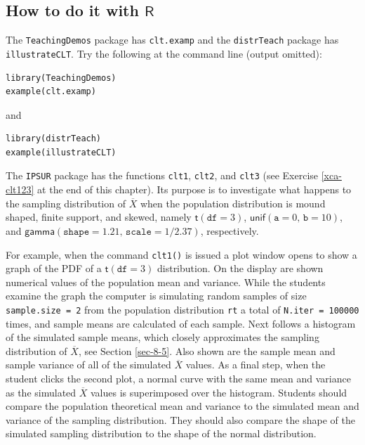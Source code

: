 \documentclass[captions=tableheading]{scrbook}
\begin{document}
\subsection{How to do it with \(\mathsf{R}\)}
\label{sec-8-3-1}


The \texttt{TeachingDemos} package \cite{Snowteachingdemos} has \texttt{clt.examp} and the \texttt{distrTeach} \cite{Ruckdescheldistr} package has \texttt{illustrateCLT}. Try the following at the command line (output omitted):

\lstset{language=R}
\begin{lstlisting}
library(TeachingDemos)
example(clt.examp)
\end{lstlisting}
and

\lstset{language=R}
\begin{lstlisting}
library(distrTeach)
example(illustrateCLT)
\end{lstlisting}

The \texttt{IPSUR}  package has the functions \texttt{clt1}, \texttt{clt2}, and \texttt{clt3} (see Exercise \ref{xca-clt123} at the end of this chapter). Its purpose is to investigate what happens to the sampling distribution of \(\overline{X}\) when the population distribution is mound shaped, finite support, and skewed, namely \(\mathsf{t}(\mathtt{df}=3)\), \(\mathsf{unif}(\mathtt{a}=0,\,\mathtt{b}=10)\), and \(\mathsf{gamma}(\mathtt{shape}=1.21,\,\mathtt{scale}=1/2.37)\), respectively. 

For example, when the command \texttt{clt1()}  is issued a plot window opens to show a graph of the PDF of a \(\mathsf{t}(\mathtt{df}=3)\) distribution. On the display are shown numerical values of the population mean and variance. While the students examine the graph the computer is simulating random samples of size \texttt{sample.size = 2} from the population distribution \texttt{rt} a total of \texttt{N.iter = 100000} times, and sample means are calculated of each sample. Next follows a histogram of the simulated sample means, which closely approximates the sampling distribution of \(\overline{X}\), see Section \ref{sec-8-5}. Also shown are the sample mean and sample variance of all of the simulated  \( \overline{X} \) values. As a final step, when the student clicks the second plot, a normal curve with the same mean and variance as the simulated \( \overline{X} \) values is superimposed over the histogram. Students should compare the population theoretical mean and variance to the simulated mean and variance of the sampling distribution. They should also compare the shape of the simulated sampling distribution to the shape of the normal distribution.
\end{document}
